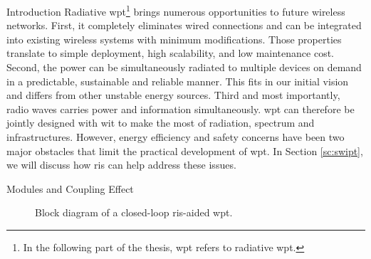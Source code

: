 \begin{section}{}
\begin{subsection}{Introduction}
		Radiative \gls{wpt}\footnote{In the following part of the thesis, \gls{wpt} refers to radiative \gls{wpt}.} brings numerous opportunities to future wireless networks.
		First, it completely eliminates wired connections and can be integrated into existing wireless systems with minimum modifications.
		Those properties translate to simple deployment, high scalability, and low maintenance cost.
		Second, the power can be simultaneously radiated to multiple devices on demand in a predictable, sustainable and reliable manner.
		This fits in our initial vision and differs from other unstable energy sources.
		Third and most importantly, radio waves carries power and information simultaneously.
		\gls{wpt} can therefore be jointly designed with \gls{wit} to make the most of radiation, spectrum and infrastructures.
		However, energy efficiency and safety concerns have been two major obstacles that limit the practical development of \gls{wpt}.
		In Section \ref{sc:swipt}, we will discuss how \gls{ris} can help address these issues.
	\end{subsection}

	\begin{subsection}{Modules and Coupling Effect}
		\begin{figure}[H]
			\centering
			\resizebox{\columnwidth}{!}{
				
			}
			\caption{Block diagram of a closed-loop \gls{ris}-aided \gls{wpt}.}
			\label{fg:wpt_architecture}
		\end{figure}


\end{subsection}
\end{section}
